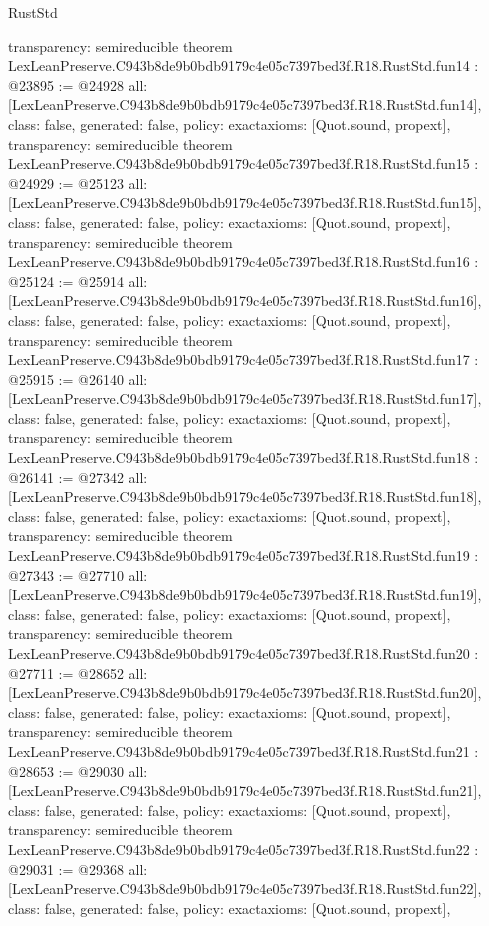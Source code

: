 \begin{lexlean}{RustStd}
\begin{coremodule}
{  transparency: semireducible
}
theorem LexLeanPreserve.C943b8de9b0bdb9179c4e05c7397bed3f.R18.RustStd.fun14 : @23895 := @24928 {
  all: [LexLeanPreserve.C943b8de9b0bdb9179c4e05c7397bed3f.R18.RustStd.fun14],
  class: false,
  generated: false,
  policy: exact{axioms: [Quot.sound, propext]},
  transparency: semireducible
}
theorem LexLeanPreserve.C943b8de9b0bdb9179c4e05c7397bed3f.R18.RustStd.fun15 : @24929 := @25123 {
  all: [LexLeanPreserve.C943b8de9b0bdb9179c4e05c7397bed3f.R18.RustStd.fun15],
  class: false,
  generated: false,
  policy: exact{axioms: [Quot.sound, propext]},
  transparency: semireducible
}
theorem LexLeanPreserve.C943b8de9b0bdb9179c4e05c7397bed3f.R18.RustStd.fun16 : @25124 := @25914 {
  all: [LexLeanPreserve.C943b8de9b0bdb9179c4e05c7397bed3f.R18.RustStd.fun16],
  class: false,
  generated: false,
  policy: exact{axioms: [Quot.sound, propext]},
  transparency: semireducible
}
theorem LexLeanPreserve.C943b8de9b0bdb9179c4e05c7397bed3f.R18.RustStd.fun17 : @25915 := @26140 {
  all: [LexLeanPreserve.C943b8de9b0bdb9179c4e05c7397bed3f.R18.RustStd.fun17],
  class: false,
  generated: false,
  policy: exact{axioms: [Quot.sound, propext]},
  transparency: semireducible
}
theorem LexLeanPreserve.C943b8de9b0bdb9179c4e05c7397bed3f.R18.RustStd.fun18 : @26141 := @27342 {
  all: [LexLeanPreserve.C943b8de9b0bdb9179c4e05c7397bed3f.R18.RustStd.fun18],
  class: false,
  generated: false,
  policy: exact{axioms: [Quot.sound, propext]},
  transparency: semireducible
}
theorem LexLeanPreserve.C943b8de9b0bdb9179c4e05c7397bed3f.R18.RustStd.fun19 : @27343 := @27710 {
  all: [LexLeanPreserve.C943b8de9b0bdb9179c4e05c7397bed3f.R18.RustStd.fun19],
  class: false,
  generated: false,
  policy: exact{axioms: [Quot.sound, propext]},
  transparency: semireducible
}
theorem LexLeanPreserve.C943b8de9b0bdb9179c4e05c7397bed3f.R18.RustStd.fun20 : @27711 := @28652 {
  all: [LexLeanPreserve.C943b8de9b0bdb9179c4e05c7397bed3f.R18.RustStd.fun20],
  class: false,
  generated: false,
  policy: exact{axioms: [Quot.sound, propext]},
  transparency: semireducible
}
theorem LexLeanPreserve.C943b8de9b0bdb9179c4e05c7397bed3f.R18.RustStd.fun21 : @28653 := @29030 {
  all: [LexLeanPreserve.C943b8de9b0bdb9179c4e05c7397bed3f.R18.RustStd.fun21],
  class: false,
  generated: false,
  policy: exact{axioms: [Quot.sound, propext]},
  transparency: semireducible
}
theorem LexLeanPreserve.C943b8de9b0bdb9179c4e05c7397bed3f.R18.RustStd.fun22 : @29031 := @29368 {
  all: [LexLeanPreserve.C943b8de9b0bdb9179c4e05c7397bed3f.R18.RustStd.fun22],
  class: false,
  generated: false,
  policy: exact{axioms: [Quot.sound, propext]},
}
\end{coremodule}
\end{lexlean}
